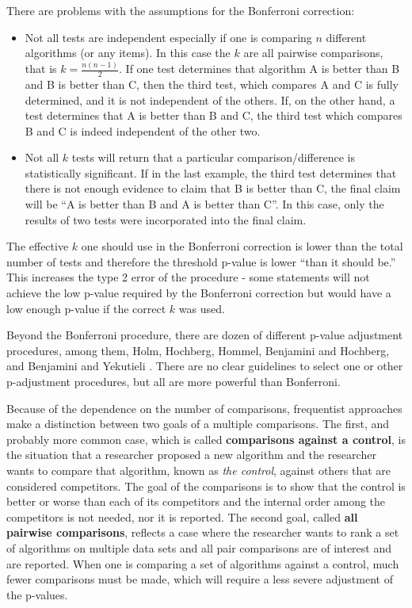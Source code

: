 \documentclass[twoside,11pt,preprint]{article}
\begin{document}
There are problems with the assumptions for the Bonferroni correction:

\begin{itemize}
\item
  Not all tests are independent especially if one is comparing \(n\)
  different algorithms (or any items). In this case the \(k\) are all
  pairwise comparisons, that is \(k = \frac{n(n-1)}{2}\). If one test
  determines that algorithm A is better than B and B is better than
  C, then the third test, which compares A and C is fully
  determined, and it is not independent of the others. If, on the
  other hand, a test determines that A is better than B and C, the
  third test which compares B and C is indeed independent of the
  other two.
\item
  Not all \(k\) tests will return that a particular
  comparison/difference is statistically significant. If in the
  last example, the third test determines that there is not enough
  evidence to claim that B is better than C, the final claim will be
  ``A is better than B and A is better than C''. In this case, only
  the results of two tests were incorporated into the final claim.
\end{itemize}

The effective \(k\) one should use in the Bonferroni correction is lower
than the total number of tests and therefore the threshold p-value is
lower ``than it should be.'' This increases the type 2 error of the
procedure - some statements will not achieve the low p-value required
by the Bonferroni correction but would have a low enough p-value if the
correct \(k\) was used.

Beyond the Bonferroni procedure, there are dozen of different p-value
adjustment procedures, among them, Holm, Hochberg, Hommel, Benjamini and
Hochberg, and Benjamini and Yekutieli \citep{padj}. There are no clear
guidelines to select one or other p-adjustment procedures, but all are
more powerful than Bonferroni.

Because of the dependence on the number of comparisons, frequentist
approaches make a distinction between two goals of a
multiple comparisons. The first, and probably more common case, which
is called \textbf{comparisons against a control}, is the situation that
a researcher proposed a new algorithm and the researcher wants to
compare that algorithm, known as \emph{the control}, against others that are
considered competitors. The goal of the comparisons is to show
that the control is better or worse than each of its competitors and
the internal order among the competitors is not needed, nor it is
reported. The second goal, called \textbf{all pairwise
comparisons}, reflects a case where the researcher wants to rank a
set of algorithms on multiple data sets and all pair comparisons
are of interest and are reported. When one is comparing a set of
algorithms against a control, much fewer comparisons must be made,
which will require a less severe adjustment of the p-values.
\end{document}
